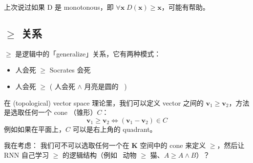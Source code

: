 \documentclass[12pt]{article}
\begin{document}
上次说过如果 D 是 monotonous，即 $\forall \mathbf{x} \; D(\mathbf{x}) \ge \mathbf{x}$，可能有帮助。

\subsection{\texorpdfstring{$\ge$}{>} 关系}

$\ge$ 是逻辑中的「generalize」关系，它有两种模式：
\begin{itemize}
\item 人会死 $\ge$ Socrates 会死
\item 人会死 $\ge$ ( 人会死 $\wedge$ 月亮是圆的 ~)
\end{itemize}

在 (topological) vector space 理论里，我们可以定义 vector 之间的 $\mathbf{v}_1 \ge \mathbf{v}_2$，方法是选取任何一个 cone （锥形）$C$：
$$ \mathbf{v}_1 \ge \mathbf{v}_2 \Leftrightarrow (\mathbf{v}_1 - \mathbf{v}_2) \in C $$
例如如果在平面上，$C$ 可以是右上角的 quadrant。

我在考虑： 我们可不可以选取任何一个在 $\mathbf{K}$ 空间中的 cone 来定义 $\ge$，然后让 RNN 自己学习 $\ge$ 的逻辑结构（例如~ 动物 $\ge $ 猫、$A \ge A \wedge B$）？
\end{document}

